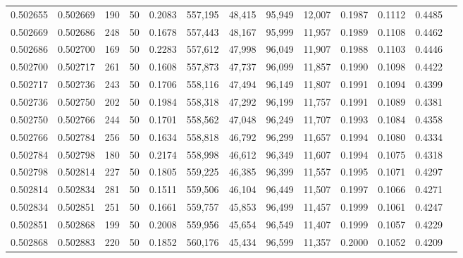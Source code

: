\begin{tabular}{rrrrrrrrrrrrr}
0.502655 & 0.502669 & 190 &  50 &                                     0.2083 & 557,195 &  48,415 &  95,949 &  12,007 & 0.1987 & 0.1112 & 0.4485 \\
0.502669 & 0.502686 & 248 &  50 &                                     0.1678 & 557,443 &  48,167 &  95,999 &  11,957 & 0.1989 & 0.1108 & 0.4462 \\
0.502686 & 0.502700 & 169 &  50 &                                     0.2283 & 557,612 &  47,998 &  96,049 &  11,907 & 0.1988 & 0.1103 & 0.4446 \\
0.502700 & 0.502717 & 261 &  50 &                                     0.1608 & 557,873 &  47,737 &  96,099 &  11,857 & 0.1990 & 0.1098 & 0.4422 \\
0.502717 & 0.502736 & 243 &  50 &                                     0.1706 & 558,116 &  47,494 &  96,149 &  11,807 & 0.1991 & 0.1094 & 0.4399 \\
0.502736 & 0.502750 & 202 &  50 &                                     0.1984 & 558,318 &  47,292 &  96,199 &  11,757 & 0.1991 & 0.1089 & 0.4381 \\
0.502750 & 0.502766 & 244 &  50 &                                     0.1701 & 558,562 &  47,048 &  96,249 &  11,707 & 0.1993 & 0.1084 & 0.4358 \\
0.502766 & 0.502784 & 256 &  50 &                                     0.1634 & 558,818 &  46,792 &  96,299 &  11,657 & 0.1994 & 0.1080 & 0.4334 \\
0.502784 & 0.502798 & 180 &  50 &                                     0.2174 & 558,998 &  46,612 &  96,349 &  11,607 & 0.1994 & 0.1075 & 0.4318 \\
0.502798 & 0.502814 & 227 &  50 &                                     0.1805 & 559,225 &  46,385 &  96,399 &  11,557 & 0.1995 & 0.1071 & 0.4297 \\
0.502814 & 0.502834 & 281 &  50 &                                     0.1511 & 559,506 &  46,104 &  96,449 &  11,507 & 0.1997 & 0.1066 & 0.4271 \\
0.502834 & 0.502851 & 251 &  50 &                                     0.1661 & 559,757 &  45,853 &  96,499 &  11,457 & 0.1999 & 0.1061 & 0.4247 \\
0.502851 & 0.502868 & 199 &  50 &                                     0.2008 & 559,956 &  45,654 &  96,549 &  11,407 & 0.1999 & 0.1057 & 0.4229 \\
0.502868 & 0.502883 & 220 &  50 &                                     0.1852 & 560,176 &  45,434 &  96,599 &  11,357 & 0.2000 & 0.1052 & 0.4209 \\

\end{tabular}
